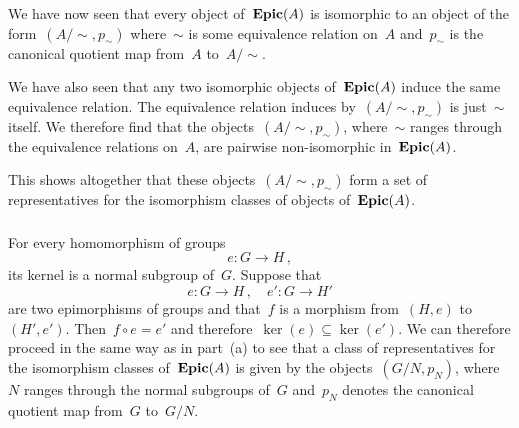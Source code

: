 We have now seen that every object of~$\mathbf{Epic}(A)$ is isomorphic to an object of the form~$(A / {∼}, p_{∼})$ where~$∼$ is some equivalence relation on~$A$ and~$p_{∼}$ is the canonical quotient map from~$A$ to~$A / {∼}$.

We have also seen that any two isomorphic objects of~$\mathbf{Epic}(A)$ induce the same equivalence relation.
The equivalence relation induces by~$(A / {∼}, p_{∼})$ is just~$∼$ itself.
We therefore find that the objects~$(A / {∼}, p_{∼})$, where~$∼$ ranges through the equivalence relations on~$A$, are pairwise non-isomorphic in~$\mathbf{Epic}(A)$.

This shows altogether that these objects~$(A / {∼}, p_{∼})$ form a set of representatives for the isomorphism classes of objects of~$\mathbf{Epic}(A)$.



\subsubsection{}

For every homomorphism of groups
\[
	e \colon G \to H \,,
\]
its kernel is a normal subgroup of~$G$.
Suppose that
\[
	e \colon G \to H \,,
	\quad
	e' \colon G \to H'
\]
are two epimorphisms of groups and that~$f$ is a morphism from~$(H, e)$ to~$(H', e')$.
Then~$f ∘ e = e'$ and therefore~$\ker(e) ⊆ \ker(e')$.
We can therefore proceed in the same way as in part~(a) to see that a class of representatives for the isomorphism classes of~$\mathbf{Epic}(A)$ is given by the objects~$(G / N, p_N)$, where~$N$ ranges through the normal subgroups of~$G$ and~$p_N$ denotes the canonical quotient map from~$G$ to~$G / N$.
